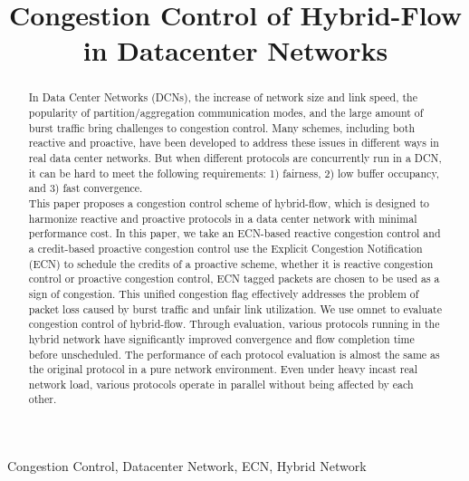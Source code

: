 \documentclass[conference]{IEEEtran}
\begin{document}
\title{Congestion Control of Hybrid-Flow in Datacenter Networks\\
}

\author{

}

\maketitle

\begin{abstract}
In Data Center Networks (DCNs), the increase of network size and link speed, the popularity of partition/aggregation communication modes, and the large amount of burst traffic bring challenges to congestion control. Many schemes, including both reactive and proactive, have been developed to address these issues in different ways in real data center networks. But when different protocols are concurrently run in a DCN, it can be hard to meet the following requirements: 1) fairness, 2) low buffer occupancy, and 3) fast convergence.\\

This paper proposes a congestion control scheme of hybrid-flow, which is designed to harmonize reactive and proactive protocols in a data center network with minimal performance cost. In this paper, we take an ECN-based reactive congestion control and a credit-based proactive congestion control use the Explicit Congestion Notification (ECN) to schedule the credits of a proactive scheme, whether it is reactive congestion control or proactive congestion control, ECN tagged packets are chosen to be used as a sign of congestion. This unified congestion flag effectively addresses the problem of packet loss caused by burst traffic and unfair link utilization. We use omnet to evaluate congestion control of hybrid-flow. Through evaluation, various protocols running in the hybrid network have significantly improved convergence and flow completion time before unscheduled. The performance of each protocol evaluation is almost the same as the original protocol in a pure network environment. Even under heavy incast real network load, various protocols operate in parallel without being affected by each other.
\end{abstract}

\begin{IEEEkeywords}
Congestion Control, Datacenter Network, ECN, Hybrid Network
\end{IEEEkeywords}
\end{document}
